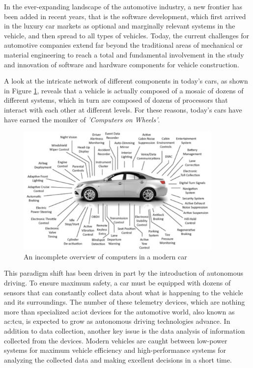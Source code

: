 In the ever-expanding landscape of the automotive industry, a new frontier has been added in recent years, that is the software development, which first arrived in the luxury car markets as optional and marginally relevant systems in the vehicle, and then spread to all types of vehicles. Today, the current challenges for automotive companies extend far beyond the traditional areas of mechanical or material engineering to reach a total and fundamental involvement in the study and innovation of software and hardware components for vehicle construction. 

A look at the intricate network of different components in today's cars, as shown in Figure \ref{fig:VheicleProcessors}, reveals that a vehicle is actually composed of a mosaic of dozens of different systems, which in turn are composed of dozens of processors that interact with each other at different levels. For these reasons, today's cars have have earned the moniker of \textit{'Computers on Wheels'}.
\begin{figure}[h]  %
  \centering
  \includegraphics[width=0.9\textwidth]{images/vehicle_processors.png}  %
  \caption{An incomplete overview of computers in a modern car \cite{ieeeSoftwareDefinedVehicle}}
  \label{fig:VheicleProcessors}
\end{figure}

This paradigm shift has been driven in part by the introduction of autonomous driving. To ensure maximum safety, a car must be equipped with dozens of sensors that can constantly collect data about what is happening to the vehicle and its surroundings. The number of these telemetry devices, which are nothing more than specialized \gls{ac:iot} devices for the automotive world, also known as \gls{ac:tcu}, is expected to grow as autonomous driving technologies advance. In addition to data collection, another key issue is the data analysis of information collected from the devices. Modern vehicles are caught between low-power systems for maximum vehicle efficiency and high-performance systems for analyzing the collected data and making excellent decisions in a short time.

